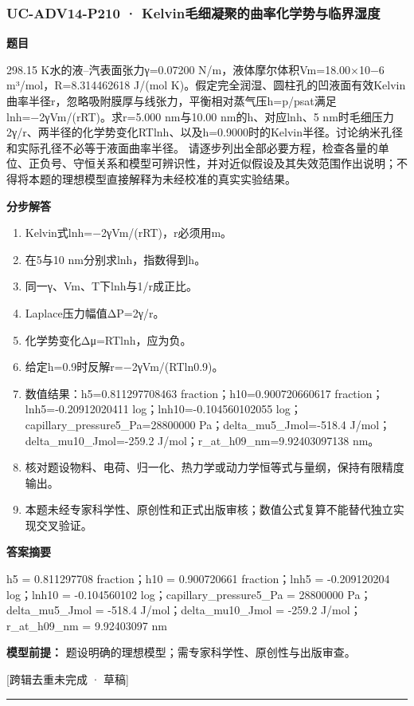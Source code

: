 \documentclass[UTF8,11pt,a4paper]{ctexart}
\begin{document}
\subsubsection*{UC-ADV14-P210 · Kelvin毛细凝聚的曲率化学势与临界湿度}
\noindent\textbf{题目}\par
298.15 K水的液–汽表面张力γ=0.07200 N/m，液体摩尔体积Vm=18.00×10−6 m³/mol，R=8.314462618 J/(mol K)。假定完全润湿、圆柱孔的凹液面有效Kelvin曲率半径r，忽略吸附膜厚与线张力，平衡相对蒸气压h=p/psat满足lnh=−2γVm/(rRT)。求r=5.000 nm与10.00 nm的h、对应lnh、5 nm时毛细压力2γ/r、两半径的化学势变化RTlnh、以及h=0.9000时的Kelvin半径。讨论纳米孔径和实际孔径不必等于液面曲率半径。 请逐步列出全部必要方程，检查各量的单位、正负号、守恒关系和模型可辨识性，并对近似假设及其失效范围作出说明；不得将本题的理想模型直接解释为未经校准的真实实验结果。\par
\medskip\noindent\textbf{分步解答}
\begin{enumerate}
\item Kelvin式lnh=−2γVm/(rRT)，r必须用m。
\item 在5与10 nm分别求lnh，指数得到h。
\item 同一γ、Vm、T下lnh与1/r成正比。
\item Laplace压力幅值ΔP=2γ/r。
\item 化学势变化Δμ=RTlnh，应为负。
\item 给定h=0.9时反解r=−2γVm/(RTln0.9)。
\item 数值结果：h5=0.811297708463 fraction；h10=0.900720660617 fraction；lnh5=-0.20912020411 log；lnh10=-0.104560102055 log；capillary\_pressure5\_Pa=28800000 Pa；delta\_mu5\_Jmol=-518.4 J/mol；delta\_mu10\_Jmol=-259.2 J/mol；r\_at\_h09\_nm=9.92403097138 nm。
\item 核对题设物料、电荷、归一化、热力学或动力学恒等式与量纲，保持有限精度输出。
\item 本题未经专家科学性、原创性和正式出版审核；数值公式复算不能替代独立实现交叉验证。
\end{enumerate}
\noindent\textbf{答案摘要}\par
h5 = 0.811297708 fraction；h10 = 0.900720661 fraction；lnh5 = -0.209120204 log；lnh10 = -0.104560102 log；capillary\_pressure5\_Pa = 28800000 Pa；delta\_mu5\_Jmol = -518.4 J/mol；delta\_mu10\_Jmol = -259.2 J/mol；r\_at\_h09\_nm = 9.92403097 nm\par
\noindent\textbf{模型前提：}
题设明确的理想模型；需专家科学性、原创性与出版审查。\par
\noindent\textcolor{red!65!black}{[跨辑去重未完成 · 草稿]} \par
\medskip\hrule\medskip
{}
\end{document}
